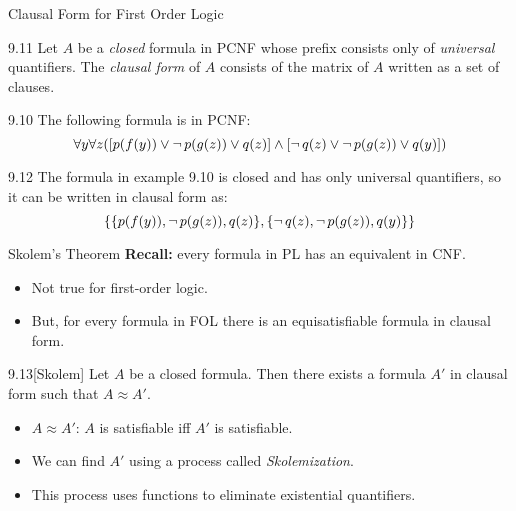 \documentclass[style=sailor,size=12pt]{powerdot}
\begin{document}
\begin{wideslide}[bm=,toc=]{Clausal Form for First Order Logic}
\begin{defn}{9.11}
Let $A$ be a \emph{closed} formula in PCNF whose prefix consists only of 
\emph{universal} quantifiers. The \emph{clausal form} of $A$ consists of
the matrix of $A$ written as a set of clauses.
\end{defn}
\begin{ex}{9.10}
The following formula is in PCNF:
\[
  \forall y \forall z([p(f(y)) \lor \mathop{\neg} p (g(z)) \lor q(z)] \land [ \mathop{\neg} q(z)
      \lor \mathop{\neg} p (g(z)) \lor q(y)])
  \]
\end{ex}
\begin{ex}{9.12}
The formula in example 9.10 is closed and has only universal quantifiers, so it
can be written in clausal form as:
\[
   \{\{p(f(y)), \mathop{\neg} p(g(z)), q(z)\}, \{ \mathop{\neg} q(z), \mathop{\neg} p (g(z)), q(y)\}\}
  \]
\end{ex}
\end{wideslide}
\begin{wideslide}[bm=,toc=]{Skolem's Theorem}
{\bf Recall:} every formula in PL has an equivalent in CNF.
\begin{itemize}
\item Not true for first-order logic.
\item But, for every formula in FOL there is an equisatisfiable formula
in clausal form.
\end{itemize}
\begin{thm}{9.13}[Skolem]
Let $A$ be a closed formula. Then there exists a formula $A'$ in clausal form
such that $A \approx A'$.
\end{thm}

\begin{itemize}
\item $A \approx A'$: $A$ is satisfiable iff $A'$ is satisfiable. 
\item We can find $A'$ using a process called \emph{Skolemization}. 
\item This process uses functions to eliminate existential quantifiers.
\end{itemize}
\end{wideslide}
\end{document}
